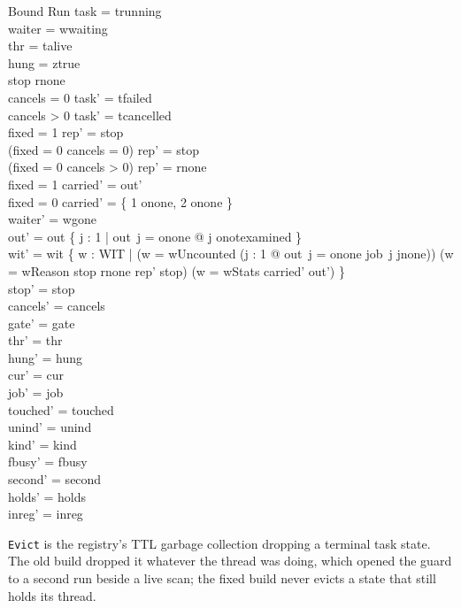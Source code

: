 \documentclass[a4paper,10pt,fleqn]{article}
\newcommand{\field}[1]{\texttt{#1}}
\begin{document}
\begin{schema}{Bound}
\Delta Run
\where
task = trunning \\
waiter = wwaiting \\
thr = talive \\
hung = ztrue \\
stop \neq rnone \\
cancels = 0 \implies task' = tfailed \\
cancels > 0 \implies task' = tcancelled \\
fixed = 1 \implies rep' = stop \\
(fixed = 0 \land cancels = 0) \implies rep' = stop \\
(fixed = 0 \land cancels > 0) \implies rep' = rnone \\
fixed = 1 \implies carried' = out' \\
fixed = 0 \implies carried' = \{ 1 \mapsto onone, 2 \mapsto onone \} \\
waiter' = wgone \\
out' = out \oplus \{ j : 1  | out~j = onone @ j \mapsto onotexamined \} \\
wit' = wit \cup \{ w : WIT |
  (w = wUncounted \land (\exists j : 1  @ out~j = onone \land job~j \neq jnone)) \lor (w = wReason \land stop \neq rnone \land rep' \neq stop) \lor (w = wStats \land carried' \neq out') \} \\
stop' = stop \\
cancels' = cancels \\
gate' = gate \\
thr' = thr \\
hung' = hung \\
cur' = cur \\
job' = job \\
touched' = touched \\
unind' = unind \\
kind' = kind \\
fbusy' = fbusy \\
second' = second \\
holds' = holds \\
inreg' = inreg
\end{schema}

\field{Evict} is the registry's TTL garbage collection dropping a terminal task
state. The old build dropped it whatever the thread was doing, which opened the
guard to a second run beside a live scan; the fixed build never evicts a state
that still holds its thread.
\end{document}
